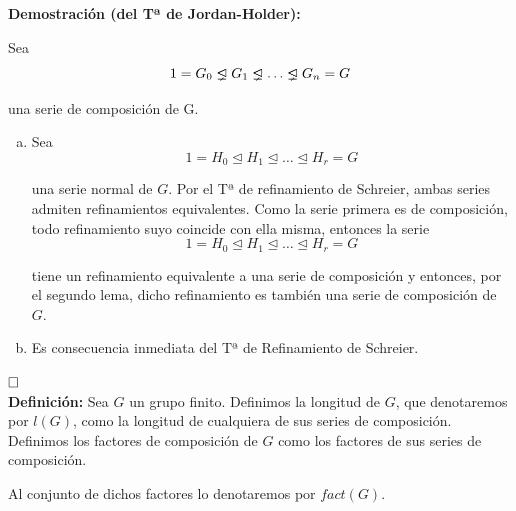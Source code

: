 \documentclass{article}
\newcommand{\unlhdneq}{%
  \mathrel{\ooalign{$\lneq$\cr\raise.22ex\hbox{$\lhd$}\cr}}}
\begin{document}
\textbf{Demostración (del Tª de Jordan-Holder):}

Sea 
\begin{equation*}
1=G_0\unlhdneq G_1\unlhdneq \ldots\unlhdneq G_n=G 
\end{equation*}

una serie de composición de G.

\begin{enumerate}[a)]
\item Sea 
\begin{equation*}
1=H_0\unlhd H_1\unlhd \ldots \unlhd H_r=G
\end{equation*}

una serie normal de $G$. Por el Tª de refinamiento de Schreier, ambas series admiten refinamientos equivalentes. Como la serie primera es de composición, todo refinamiento suyo coincide con ella misma, entonces la serie
\begin{equation}
1=H_0\unlhd H_1\unlhd \ldots\unlhd H_r=G
\end{equation}

tiene un refinamiento equivalente a una serie de composición y entonces, por el segundo lema, dicho refinamiento es también una serie de composición de $G$.

\item Es consecuencia inmediata del Tª de Refinamiento de Schreier.
\end{enumerate}
$\hfill\square$ \\

\textbf{Definición:} Sea $G$ un grupo finito. Definimos la longitud de $G$, que denotaremos por $l(G)$, como la longitud de cualquiera de sus series de composición. \\

Definimos los factores de composición de $G$ como los factores de sus series de composición.

Al conjunto de dichos factores lo denotaremos por $fact(G)$. \\
\end{document}
